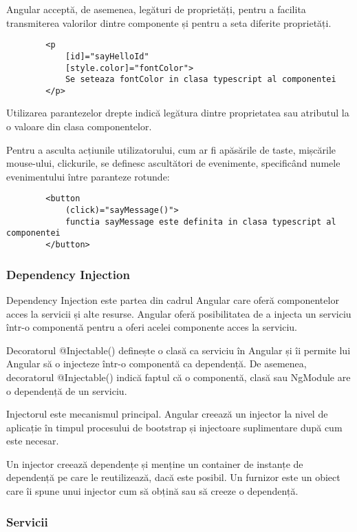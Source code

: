 \documentclass[a4paper,12pt]{article}
\begin{document}
    Angular acceptă, de asemenea, legături de proprietăți, pentru a facilita transmiterea valorilor dintre componente și pentru a seta diferite proprietăți.
    \begin{lstlisting}
        <p
            [id]="sayHelloId"
            [style.color]="fontColor">
            Se seteaza fontColor in clasa typescript al componentei
        </p>
    \end{lstlisting}

    Utilizarea parantezelor drepte indică legătura dintre proprietatea sau atributul la o valoare din clasa componentelor.

    Pentru a asculta acțiunile utilizatorului, cum ar fi apăsările de taste, mișcările mouse-ului, clickurile, se definesc ascultători de evenimente, specificând
    numele evenimentului între paranteze rotunde:
    \begin{lstlisting}
        <button
            (click)="sayMessage()">
            functia sayMessage este definita in clasa typescript al componentei
        </button>
    \end{lstlisting}

    \subsubsection{Dependency Injection}

    Dependency Injection este partea din cadrul Angular care oferă componentelor acces la servicii și alte resurse. Angular oferă posibilitatea de a 
    injecta un serviciu într-o componentă pentru a oferi acelei componente acces la serviciu.

    Decoratorul @Injectable() definește o clasă ca serviciu în Angular și îi permite lui Angular să o injecteze într-o componentă ca dependență. 
    De asemenea, decoratorul @Injectable() indică faptul că o componentă, clasă sau NgModule are o dependență de un serviciu.

    Injectorul este mecanismul principal. Angular creează un injector la nivel de aplicație în timpul procesului de bootstrap și injectoare suplimentare după cum este necesar.

    Un injector creează dependențe și menține un container de instanțe de dependență pe care le reutilizează, dacă este posibil. Un furnizor este un obiect care îi spune 
    unui injector cum să obțină sau să creeze o dependență.
    \subsubsection{Servicii}
\end{document}

